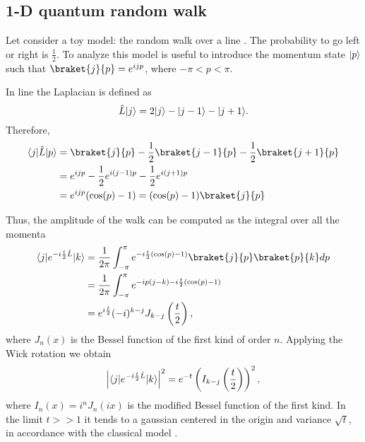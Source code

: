 \subsection{1-D quantum random walk}
Let consider a toy model: the random walk over a line \cite{Farhi_98}. The probability to go left or right is $\frac{1}{2}$.
To analyze this model is useful to introduce the momentum state $\lvert p\rangle$ such that $\braket{j}{p} = e^{ijp}$, where $-\pi < p< \pi$.

In line the Laplacian is defined as
\begin{equation}
    \hat L \lvert j\rangle = 2\lvert j\rangle -\lvert j-1\rangle -\lvert j+1\rangle . 
\end{equation}
Therefore,
\begin{equation}
    \begin{split}
        \bra{j}\hat L \ket{p} &= \braket{j}{p} -\frac{1}{2}\braket{j-1}{p} -\frac{1}2{}\braket{j+1}{p}\\
        &= e^{ijp} -\frac{1}{2}e^{i(j-1)p} - \frac{1}{2}e^{i(j+1)p}\\
        &= e^{ijp}(\cos(p) - 1) = (\cos(p) - 1)\braket{j}{p}
    \end{split}
\end{equation}

Thus, the amplitude of the walk can be computed as the integral over all the momenta
\begin{equation}
    \begin{split}
        \bra{j}e^{-i\frac{t}{2}\hat L} \ket{k}&= \frac{1}{2\pi}\int_{-\pi}^{\pi} e^{-i\frac{t}{2}(\cos(p) - 1)} \braket{j}{p} \braket{p}{k} dp\\
        &= \frac{1}{2\pi}\int_{-\pi}^{\pi} e^{-ip(j-k)-i\frac{t}{2}(\cos(p) - 1)}\\
        & = e^{i\frac{t}{2}}(-i)^{k-j}J_{k-j}\left(\frac{t}{2}\right),
   \end{split}
\end{equation}
where $J_{n}(x)$ is the Bessel function of the first kind of order $n$. 
Applying the Wick rotation we obtain 
\begin{equation}
    \left|\langle j\rvert e^{-i\frac{t}{2}\hat L} \lvert k\rangle\right|^2 = e^{-t} \left(I_{k-j}\left(\frac{t}{2}\right)\right)^2,
\end{equation}
where $I_{n}(x) = i^{n}J_{n}(ix)$ is the modified Bessel function of the first kind.
In the limit $t>>1$ it tends to a gaussian centered in the origin and variance $\sqrt{t}$, in accordance with the classical model \cite{mabramowitz64:handbook}.

